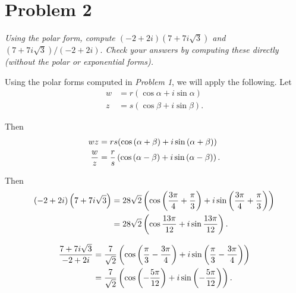 \documentclass{tufte-handout}
\begin{document}
\section{Problem 2}

\emph{Using the polar form, compute $(-2+2i)(7 + 7i\sqrt{3})$
    and $(7 + 7i\sqrt{3})/(-2 + 2i).$ Check your answers by computing
    these directly (without the polar or exponential forms).}

\bigskip

Using the polar forms computed in \textit{Problem 1}, we will apply
the following. Let
\begin{align*}
  w &= r(\cos \alpha + i \sin \alpha)\\
  z &= s(\cos \beta + i \sin \beta).
\end{align*}

Then
\begin{align*}
  wz &= rs(\cos{(\alpha + \beta)} + i \sin{(\alpha + \beta)})\\
  {w \over z} &= {r \over s} \left( \cos{ (\alpha - \beta)} + i \sin{
                (\alpha - \beta)}\right).
\end{align*}

Then
\begin{align*}
  (-2 + 2i)\left(7 + 7i\sqrt 3\right) &= 28 \sqrt 2 \left( \cos{
                                        \left( {3 \pi \over 4} + {\pi
                                        \over 3}\right)} + i \sin{
                                        \left( {3 \pi \over 4} + {\pi
                                        \over 3}\right)}\right)\\
                                      &= 28 \sqrt 2 \left( \cos{ 13
                                        \pi \over 12} + i \sin{ 13 \pi
                                        \over 12}\right).
\end{align*}

\begin{align*}
  {7 + 7i \sqrt 3 \over -2 + 2i} &= {7 \over \sqrt 2} \left( \cos{
                                   \left( {\pi \over
                                   3} - {3 \pi \over 4} \right)} + i
                                   \sin{ \left( {\pi \over 3} - {3 \pi
                                   \over 4} \right) }\right)\\
                                 &= {7 \over \sqrt 2} \left(
                                   \cos{ \left( -{5 \pi \over 12}
                                   \right)} + i
                                   \sin{ \left( -{5 \pi \over 12}
                                   \right)} \right).\\
\end{align*}
\end{document}
